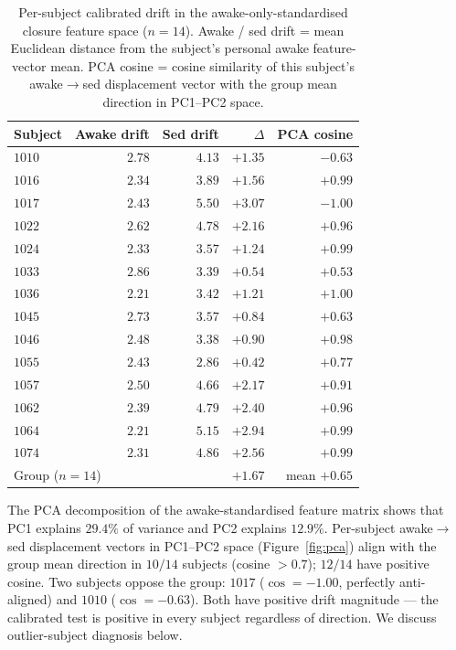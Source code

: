 \documentclass[11pt,a4paper]{article}
\begin{document}
\begin{table}[h]
\centering\small
\caption{Per-subject calibrated drift in the awake-only-standardised closure feature space ($n=14$). Awake / sed drift = mean Euclidean distance from the subject's personal awake feature-vector mean. PCA cosine = cosine similarity of this subject's awake$\to$sed displacement vector with the group mean direction in PC1--PC2 space.}\label{tab:drift}
\begin{tabular}{lrrrr}\toprule
Subject & Awake drift & Sed drift & $\Delta$ & PCA cosine \\
\midrule
$1010$ & $2.78$ & $4.13$ & $+1.35$ & $-0.63$ \\
$1016$ & $2.34$ & $3.89$ & $+1.56$ & $+0.99$ \\
$1017$ & $2.43$ & $5.50$ & $+3.07$ & $-1.00$ \\
$1022$ & $2.62$ & $4.78$ & $+2.16$ & $+0.96$ \\
$1024$ & $2.33$ & $3.57$ & $+1.24$ & $+0.99$ \\
$1033$ & $2.86$ & $3.39$ & $+0.54$ & $+0.53$ \\
$1036$ & $2.21$ & $3.42$ & $+1.21$ & $+1.00$ \\
$1045$ & $2.73$ & $3.57$ & $+0.84$ & $+0.63$ \\
$1046$ & $2.48$ & $3.38$ & $+0.90$ & $+0.98$ \\
$1055$ & $2.43$ & $2.86$ & $+0.42$ & $+0.77$ \\
$1057$ & $2.50$ & $4.66$ & $+2.17$ & $+0.91$ \\
$1062$ & $2.39$ & $4.79$ & $+2.40$ & $+0.96$ \\
$1064$ & $2.21$ & $5.15$ & $+2.94$ & $+0.99$ \\
$1074$ & $2.31$ & $4.86$ & $+2.56$ & $+0.99$ \\
\midrule
\multicolumn{2}{l}{Group ($n=14$)} & & $+1.67$ & mean $+0.65$ \\
\bottomrule\end{tabular}
\end{table}

The PCA decomposition of the awake-standardised feature matrix shows that PC1 explains $29.4\%$ of variance and PC2 explains $12.9\%$. Per-subject awake$\to$sed displacement vectors in PC1--PC2 space (Figure~\ref{fig:pca}) align with the group mean direction in $10/14$ subjects (cosine $>0.7$); $12/14$ have positive cosine. Two subjects oppose the group: $1017$ ($\cos=-1.00$, perfectly anti-aligned) and $1010$ ($\cos=-0.63$). Both have positive drift magnitude --- the calibrated test is positive in every subject regardless of direction. We discuss outlier-subject diagnosis below.
\end{document}
